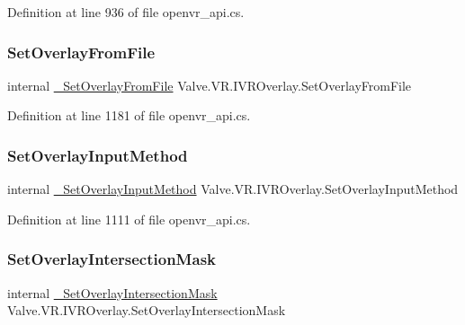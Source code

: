 Definition at line 936 of file openvr\+\_\+api.\+cs.

\mbox{\label{struct_valve_1_1_v_r_1_1_i_v_r_overlay_ae7566f3ff52167f0d3e2a88b2de1c4d0}} 
\subsubsection{\texorpdfstring{SetOverlayFromFile}{SetOverlayFromFile}}
{\footnotesize\ttfamily internal \mbox{\hyperlink{struct_valve_1_1_v_r_1_1_i_v_r_overlay_a7651c5d114e08eb5cd7813524caf5220}{\+\_\+\+Set\+Overlay\+From\+File}} Valve.\+V\+R.\+I\+V\+R\+Overlay.\+Set\+Overlay\+From\+File}



Definition at line 1181 of file openvr\+\_\+api.\+cs.

\mbox{\label{struct_valve_1_1_v_r_1_1_i_v_r_overlay_a435813588190b9a3cab143967e431d32}} 
\subsubsection{\texorpdfstring{SetOverlayInputMethod}{SetOverlayInputMethod}}
{\footnotesize\ttfamily internal \mbox{\hyperlink{struct_valve_1_1_v_r_1_1_i_v_r_overlay_ab00e26696ac1201e4fb257bb32fb2557}{\+\_\+\+Set\+Overlay\+Input\+Method}} Valve.\+V\+R.\+I\+V\+R\+Overlay.\+Set\+Overlay\+Input\+Method}



Definition at line 1111 of file openvr\+\_\+api.\+cs.

\mbox{\label{struct_valve_1_1_v_r_1_1_i_v_r_overlay_a244fb8807dfa0423820e38899e041395}} 
\subsubsection{\texorpdfstring{SetOverlayIntersectionMask}{SetOverlayIntersectionMask}}
{\footnotesize\ttfamily internal \mbox{\hyperlink{struct_valve_1_1_v_r_1_1_i_v_r_overlay_a4c59154888075e11f6eb2515fa9f3678}{\+\_\+\+Set\+Overlay\+Intersection\+Mask}} Valve.\+V\+R.\+I\+V\+R\+Overlay.\+Set\+Overlay\+Intersection\+Mask}




